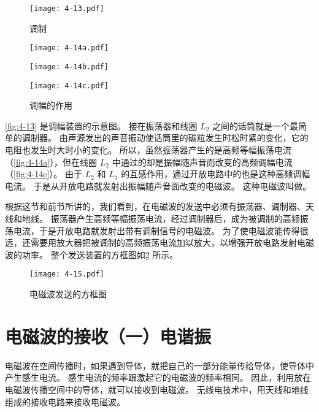 \begin{figure}
\begin{minipage}[b]{0.38\linewidth}\centering
\texttt{[image: 4-13.pdf]}
\caption{调制}\label{fig:4-13}
\end{minipage}
\nextfloat
\begin{minipage}[b]{0.58\linewidth}\centering
	\begin{minipage}{\linewidth}\centering
	  \texttt{[image: 4-14a.pdf]}
		\label{fig:4-14a}
	\end{minipage}
	\begin{minipage}{\linewidth}\centering
	  \texttt{[image: 4-14b.pdf]}
		\label{fig:4-14b}
	\end{minipage}
	\begin{minipage}{\linewidth}\centering
	  \texttt{[image: 4-14c.pdf]}
		\label{fig:4-14c}
	\end{minipage}
	\addtocounter{figure}{-1}
	\caption{调幅的作用}\label{fig:4-14}
\end{minipage}
\end{figure}


\cref{fig:4-13} 是调幅装置的示意图。
接在振荡器和线圈 $L_2$ 之间的话筒就是一个最简单的调制器。
由声源发出的声音振动使话筒里的碳粒发生时松时紧的变化，它的电阻也发生时大时小的变化。
所以，虽然振荡器产生的是高频等幅振荡电流（\cref{fig:4-14a}），但在线圈 $L_2$ 中通过的却是振幅随声音而改变的高频调幅电流（\cref{fig:4-14c}）。
由于 $L_2$ 和 $L_1$ 的互感作用，通过开放电路中的也是这种高频调幅电流。
于是从开放电路就发射出振幅随声音面改变的电磁波。
这种电磁波叫做。

根据这节和前节所讲的，我们看到，在电磁波的发送中必须有振荡器、调制器、天线和地线。
振荡器产生高频等幅振荡电流，经过调制器后，成为被调制的高频振荡电流，于是开放电路就发射出带有调制信号的电磁波。
为了使电磁波能传得很远，还需要用放大器把被调制的高频振荡电流加以放大，以增强开放电路发射电磁波的功率。
整个发送装置的方框图如\cref{fig:4-15} 所示。
\begin{figure}
	\texttt{[image: 4-15.pdf]}
	\caption{电磁波发送的方框图}\label{fig:4-15}
\end{figure}

\section{电磁波的接收（一）\texorpdfstring{\quad}{ }电谐振}
电磁波在空间传播时，如果遇到导体，就把自己的一部分能量传给导体，使导体中产生感生电流。
感生电流的频率跟激起它的电磁波的频率相同。
因此，利用放在电磁波传播空间中的导体，就可以接收到电磁波。
无线电技术中，用天线和地线组成的接收电路来接收电磁波。

